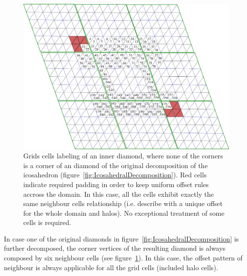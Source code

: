 \documentclass{book}
\begin{document}
\begin{figure}[htb!]
	\begin{center}
		\includegraphics[width=18cm]{fig/IcosahedralGridCellHalosInnerDiamond.png}
		\caption{Grids cells labeling of an inner diamond, where none 
			of the corners is a corner of an diamond of the original 
			decomposition of the icosahedron (figure~\ref{fig:IcosahedralDecomposition}).
			Red cells indicate required padding in order to keep uniform offset rules accross the domain. 
			In this case, all the cells exhibit exactly the same neighbour cells relationship (i.e. describe with a unique offset for the whole domain and halos). No exceptional treatment of some cells is required.
		}
		\label{fig:IcosahedralDiamondWithHalosInnerDiamond}
	\end{center}
\end{figure}

In case one of the original diamonds in figure~\ref{fig:IcosahedralDecomposition} is further decomposed, the corner vertices
of the resulting diamond is always composed by six neighbour cells
(see figure~\ref{fig:IcosahedralDiamondWithHalosInnerDiamond}).
In this case, the offset pattern of neighbour is always applicable for all the grid cells (included halo cells).




{}
\end{document}

